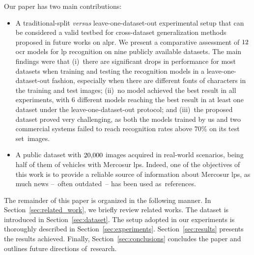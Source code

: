 Our paper has two main contributions:
\begin{itemize}
    \item A traditional-split \textit{versus} leave-one-dataset-out experimental setup that can be considered a valid testbed for cross-dataset generalization methods proposed in future works on \gls*{alpr}.
    We present a comparative assessment of $12$ \gls*{ocr} models for \gls*{lp} recognition on nine publicly available datasets.
    The main findings were that
    (i)~there are significant drops in performance for most datasets when training and testing the recognition models in a leave-one-dataset-out fashion, especially when there are different fonts of characters in the training and test images;
    (ii)~no model achieved the best result in all experiments, with $6$ different models reaching the best result in at least one dataset under the leave-one-dataset-out protocol; 
    and (iii)~the proposed dataset proved very challenging, as both the models trained by us and two commercial systems failed to reach recognition rates above $70$\% on its test set~images.
    \item A public dataset with $20{,}000$ images acquired in real-world scenarios, being half of them of vehicles with Mercosur \glspl*{lp}.
    Indeed, one of the objectives of this work is to provide a reliable source of information about Mercosur \glspl*{lp}, as much news --~often outdated~-- has been used as~references.
\end{itemize}

The remainder of this paper is organized in the following manner. 
In Section~\ref{sec:related_work}, we briefly review related works.
The \dataset dataset is introduced in Section~\ref{sec:dataset}.
The setup adopted in our experiments is thoroughly described in Section~\ref{sec:experiments}.
Section~\ref{sec:results} presents the results achieved.
Finally, Section~\ref{sec:conclusions} concludes the paper and outlines future directions of~research.